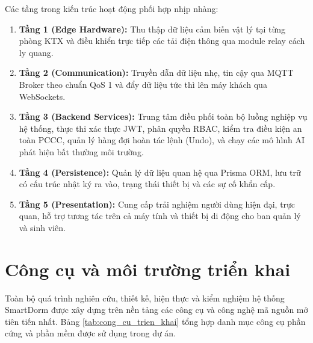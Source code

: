 Các tầng trong kiến trúc hoạt động phối hợp nhịp nhàng:
\begin{enumerate}
    \item \textbf{Tầng 1 (Edge Hardware):} Thu thập dữ liệu cảm biến vật lý tại từng phòng KTX và điều khiển trực tiếp các tải điện thông qua module relay cách ly quang.
    \item \textbf{Tầng 2 (Communication):} Truyền dẫn dữ liệu nhẹ, tin cậy qua MQTT Broker theo chuẩn QoS 1 và đẩy dữ liệu tức thì lên máy khách qua WebSockets.
    \item \textbf{Tầng 3 (Backend Services):} Trung tâm điều phối toàn bộ luồng nghiệp vụ hệ thống, thực thi xác thực JWT, phân quyền RBAC, kiểm tra điều kiện an toàn PCCC, quản lý hàng đợi hoàn tác lệnh (Undo), và chạy các mô hình AI phát hiện bất thường môi trường.
    \item \textbf{Tầng 4 (Persistence):} Quản lý dữ liệu quan hệ qua Prisma ORM, lưu trữ có cấu trúc nhật ký ra vào, trạng thái thiết bị và các sự cố khẩn cấp.
    \item \textbf{Tầng 5 (Presentation):} Cung cấp trải nghiệm người dùng hiện đại, trực quan, hỗ trợ tương tác trên cả máy tính và thiết bị di động cho ban quản lý và sinh viên.
\end{enumerate}

\section{Công cụ và môi trường triển khai}
\label{sec:cong_cu_moi_truong}

Toàn bộ quá trình nghiên cứu, thiết kế, hiện thực và kiểm nghiệm hệ thống SmartDorm được xây dựng trên nền tảng các công cụ và công nghệ mã nguồn mở tiên tiến nhất. Bảng \ref{tab:cong_cu_trien_khai} tổng hợp danh mục công cụ phần cứng và phần mềm được sử dụng trong dự án.

